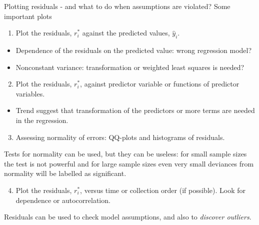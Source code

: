 \documentclass[
  ignorenonframetext,
]{beamer}
\providecommand{\tightlist}{%
  \setlength{\itemsep}{0pt}\setlength{\parskip}{0pt}}
\begin{document}
\begin{frame}
\begin{block}{Plotting residuals - and what to do when assumptions are
violated?}
\label{plotting-residuals---and-what-to-do-when-assumptions-are-violated}
Some important plots

\begin{enumerate}
\tightlist
\item
  Plot the residuals, \(r^*_i\) against the predicted values,
  \(\hat{y}_i\).
\end{enumerate}

\begin{itemize}
\item
  Dependence of the residuals on the predicted value: wrong regression
  model?
\item
  Nonconstant variance: transformation or weighted least squares is
  needed?
\end{itemize}

\begin{enumerate}
\setcounter{enumi}{1}
\tightlist
\item
  Plot the residuals, \(r^*_i\), against predictor variable or functions
  of predictor variables.
\end{enumerate}

\begin{itemize}
\tightlist
\item
  Trend suggest that transformation of the predictors or more terms are
  needed in the regression.
\end{itemize}
\end{block}
\end{frame}

\begin{frame}
\begin{enumerate}
\setcounter{enumi}{2}
\tightlist
\item
  Assessing normality of errors: QQ-plots and histograms of residuals.
\end{enumerate}

Tests for normality can be used, but they can be useless: for small
sample sizes the test is not powerful and for large sample sizes even
very small deviances from normality will be labelled as significant.

\begin{enumerate}
\setcounter{enumi}{3}
\tightlist
\item
  Plot the residuals, \(r^*_i\), versus time or collection order (if
  possible). Look for dependence or autocorrelation.
\end{enumerate}

Residuals can be used to check model assumptions, and also to
\emph{discover outliers}.
\end{frame}
\end{document}

